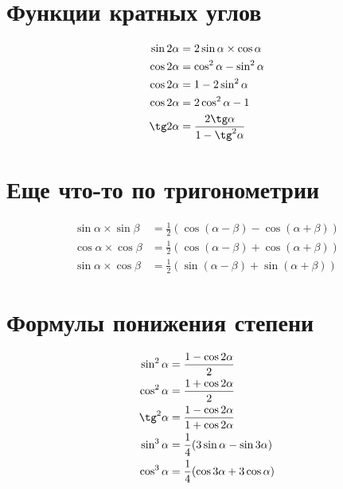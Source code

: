 \documentclass[a4paper,12pt]{article}
\begin{document}
\section{Функции кратных углов}

\begin{align*}
\sin2\alpha &= 2\sin\alpha \times \cos\alpha \\
\cos2\alpha &= \cos^2\alpha - \sin^2\alpha \\
\cos2\alpha &= 1 - 2\sin^2\alpha \\
\cos2\alpha &= 2\cos^2\alpha - 1 \\
\tg2\alpha &= \frac{2\tg\alpha}{1 - \tg^2\alpha}
\end{align*}

\section{Еще что-то по тригонометрии}

\begin{align*}
\sin\alpha \times \sin\beta &= \frac{1}{2}(\cos(\alpha - \beta) - \cos(\alpha + \beta)) \\
\cos\alpha \times \cos\beta &= \frac{1}{2}(\cos(\alpha - \beta) + \cos(\alpha + \beta)) \\
\sin\alpha \times \cos\beta &= \frac{1}{2}(\sin(\alpha - \beta) + \sin(\alpha + \beta))
\end{align*}

\section{Формулы понижения степени}

\begin{align*}
\sin^2\alpha &= \frac{1 - \cos2\alpha}{2} \\
\cos^2\alpha &= \frac{1 + \cos2\alpha}{2} \\
\tg^2\alpha &= \frac{1 - \cos2\alpha}{1 + \cos2\alpha} \\
\sin^3\alpha &= \frac{1}{4}(3\sin\alpha - \sin3\alpha) \\
\cos^3\alpha &= \frac{1}{4}(\cos3\alpha + 3\cos\alpha)
\end{align*}
\end{document}
